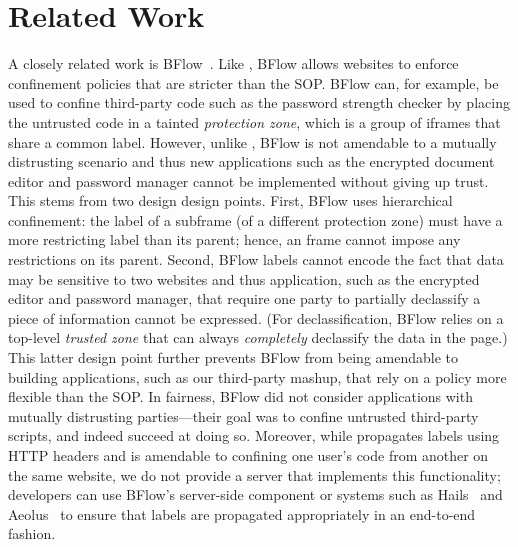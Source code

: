 \section{Related Work}
\label{sec:related}

A closely related work is BFlow~\cite{Yip:2009:PBS}.
%
Like \sys{}, BFlow allows websites to enforce confinement policies
that are stricter than the SOP.
%
BFlow can, for example, be used to confine third-party code such as
the password strength checker by placing the untrusted code in a
tainted \emph{protection zone}, which is a group of iframes that share
a common label.
%
However, unlike \sys{}, BFlow is not amendable to a mutually
distrusting scenario and thus new applications such as the encrypted
document editor and password manager cannot be implemented without
giving up trust.
%
This stems from two design design points.
%
First, BFlow uses hierarchical confinement: the label of a subframe
(of a different protection zone) must have a more restricting label
than its parent; hence, an frame cannot impose any restrictions on its
parent.
%
Second, BFlow labels cannot encode the fact that data may be sensitive
to two websites and thus application, such as the encrypted editor and
password manager, that require one party to partially declassify a
piece of information cannot be expressed.
%
(For declassification, BFlow relies on a top-level \emph{trusted zone}
that can always \emph{completely} declassify the data in the page.)
%
This latter design point further prevents BFlow from being amendable
to building applications, such as our third-party mashup, that rely on
a policy more flexible than the SOP.
%
In fairness, BFlow did not consider applications with mutually
distrusting parties---their goal was to confine untrusted third-party
scripts, and indeed succeed at doing so.
%
Moreover, while \sys{} propagates labels using HTTP headers and is
amendable to confining one user's code from another on the same
website, we do not provide a server that implements this
functionality; developers can use BFlow's server-side component or
systems such as Hails~\cite{giffin:2012:hails} and
Aeolus~\cite{cheng:aeolus} to ensure that labels are propagated
appropriately in an end-to-end fashion.
%


